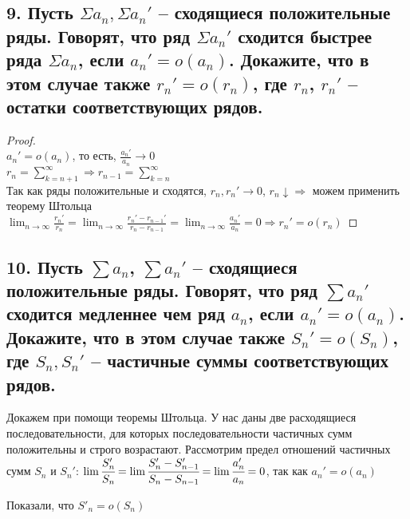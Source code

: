 \documentclass[a4paper, fleqn]{article}
\begin{document}
    \subsection*{9. Пусть $ \Sigma a_n, \Sigma a_n'$ -- сходящиеся положительные
    ряды. Говорят, что ряд $  \Sigma a_n'$ сходится быстрее ряда 
    $ \Sigma a_n$, если $  a_n' = o(a_n)$. 
    Докажите, что в этом случае также $  r_n' = o(r_n)$, где
    $ r_n$, $  r_n'$ -- остатки соответствующих рядов.}
    \begin{proof} \ \\ 
        $\displaystyle a_n' = o(a_n)$, то есть, $\displaystyle \frac{a_n'}{a_n} \to 0$ \\
        $\displaystyle r_n = \sum_{k = n + 1}^{\infty} \Rightarrow r_{n - 1} = \sum_{k = n}^{\infty}$ \\ 
        Так как ряды положительные и сходятся,
         $\displaystyle r_n, r_n' \to 0$, $\displaystyle r_n \downarrow \Rightarrow$ можем применить
         теорему Штольца \\ 
         $\displaystyle \lim_{n \to \infty}{\frac{r_n'}{r_n}} = 
         \lim_{n \to \infty}{\frac{r_n' - r_{n - 1}'}{r_n - r_{n - 1}}} = 
         \lim_{n \to \infty}{\frac{a_n'}{a_n}} = 0 \Rightarrow r_n' = o(r_n)$
    \end{proof}
        
        \subsection*{10. Пусть $\sum a_n$, $\sum a_n'$ -- сходящиеся положительные ряды. Говорят, что ряд $\sum a_n'$ сходится медленнее чем ряд $a_n$, если $a_n'=o(a_n)$. Докажите, что в этом случае также $S_n'=o(S_n)$, где $S_n,  S_n'$ -- частичные суммы соответствующих рядов.}
        Докажем при помощи теоремы Штольца. У нас даны две расходящиеся последовательности, для которых последовательности частичных сумм положительны и строго возрастают. Рассмотрим предел отношений частичных сумм $S_n$ и $S_n'$:
        $\lim \cfrac{S_n'}{S_n}=\lim \cfrac{S_n'-S'_{n-1}}{S_n-S_{n-1}}=\lim \cfrac{a_n'}{a_n}=
        0$, так как $a_n'=o(a_n)$
        
        Показали, что $S'_n=o(S_n)$
\end{document}
